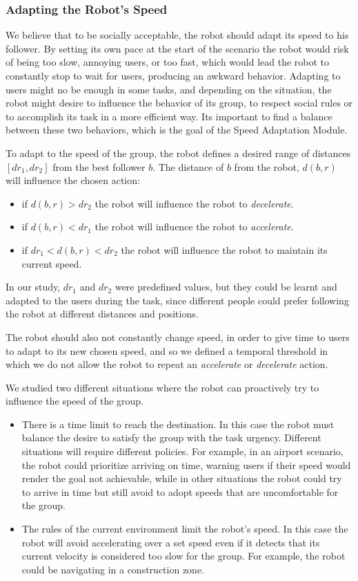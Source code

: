 \subsubsection{Adapting the Robot's Speed}
We believe that to be socially acceptable, the robot should adapt its speed to his follower. By setting its own pace at the start of the scenario the robot  would risk of being too slow, annoying users, or too fast, which would lead the robot to constantly stop to wait for users, producing an awkward behavior. Adapting to users might no be enough in some tasks, and depending on the situation, the robot might desire to influence the behavior of its group, to respect social rules or to accomplish its task in a more efficient way. Its important to find a balance between these two behaviors, which is the goal of the Speed Adaptation Module. 

To adapt to the speed of the group, the robot defines a desired range of distances $[dr_1,dr_2]$ from the best follower $b$. The distance of $b$ from the robot, $d(b,r)$ will influence the chosen action:
\begin{itemize}
\item if $d(b,r)>dr_2$ the robot will influence the robot to \textit{decelerate}.
\item if $d(b,r)<dr_1$ the robot will influence the robot to \textit{accelerate}.
\item if $dr_1<d(b,r)<dr_2$ the robot will influence the robot to maintain its current speed.
\end{itemize} 

In our study, $dr_1$ and $dr_2$ were predefined values, but they could be learnt and adapted to the users during the task, since different people could prefer following the robot at different distances and positions.

The robot should also not constantly change speed, in order to give time to users to adapt to its new chosen speed, and so we defined a temporal threshold in which we do not allow the robot to repeat an \textit{accelerate} or \textit{decelerate} action.

We studied two different situations where the robot can proactively try to influence the speed of the group.
\begin{itemize}
\item There is a time limit to reach the destination. In this case the robot must balance the desire to satisfy the group with the task urgency. Different situations will require different policies. For example, in an airport scenario, the robot could prioritize arriving on time, warning users if their speed would render the goal not achievable, while in other situations the robot could try to arrive in time but still avoid to adopt speeds that are uncomfortable for the group.
\item The rules of the current environment limit the robot's speed. In this case the robot will avoid accelerating over a set speed even if it detects that its current velocity is considered too slow for the group. For example, the robot could be navigating in a construction zone.
\end{itemize}


